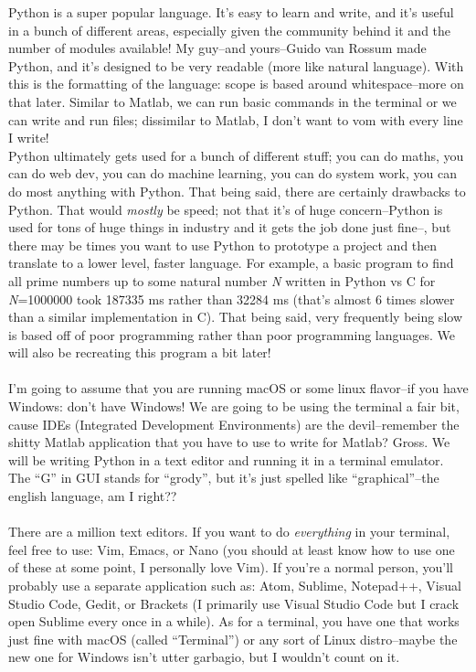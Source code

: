 \documentclass[12pt]{article}
\begin{document}
Python is a super popular language. It's easy to learn and write, and it's useful in a bunch of different areas, especially given the community behind it and the number of modules available! My guy--and yours--Guido van Rossum made Python, and it's designed to be very readable (more like natural language). With this is the formatting of the language: scope is based around whitespace--more on that later. Similar to Matlab, we can run basic commands in the terminal or we can write and run files; dissimilar to Matlab, I don't want to vom with every line I write!\\
Python ultimately gets used for a bunch of different stuff; you can do maths, you can do web dev, you can do machine learning, you can do system work, you can do most anything with Python. That being said, there are certainly drawbacks to Python. That would \textit{mostly} be speed; not that it's of huge concern--Python is used for tons of huge things in industry and it gets the job done just fine--, but there may be times you want to use Python to prototype a project and then translate to a lower level, faster language. For example, a basic program to find all prime numbers up to some natural number \textit{N} written in Python vs C for \textit{N}=1000000 took 187335 ms rather than 32284 ms (that's almost 6 times slower than a similar implementation in C). That being said, very frequently being slow is based off of poor programming rather than poor programming languages. We will also be recreating this program a bit later!\\

\\

I'm going to assume that you are running macOS or some linux flavor--if you have Windows: don't have Windows! We are going to be using the terminal a fair bit, cause IDEs (Integrated Development Environments) are the devil--remember the shitty Matlab application that you have to use to write for Matlab? Gross. We will be writing Python in a text editor and running it in a terminal emulator. The ``G'' in GUI stands for ``grody'', but it's just spelled like ``graphical''--the english language, am I right??\\

\\

There are a million text editors. If you want to do \textit{everything} in your terminal, feel free to use: Vim, Emacs, or Nano (you should at least know how to use one of these at some point, I personally love Vim). If you're a normal person, you'll probably use a separate application such as: Atom, Sublime, Notepad++, Visual Studio Code, Gedit, or Brackets (I primarily use Visual Studio Code but I crack open Sublime every once in a while). As for a terminal, you have one that works just fine with macOS (called ``Terminal'') or any sort of Linux distro--maybe the new one for Windows isn't utter garbagio, but I wouldn't count on it.\\
\end{document}
